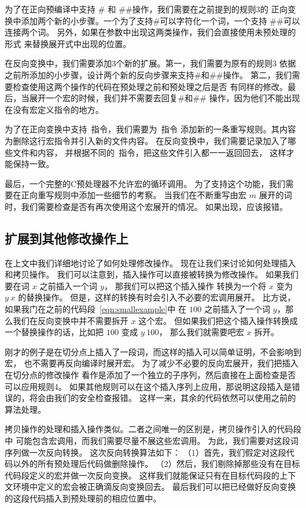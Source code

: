 为了在正向预编译中支持 \# 和 \#\#操作，我们需要在之前提到的规则3的
正向变换中添加两个新的小步骤。一个为了支持\#可以字符化一个词，一个支持
\#\#可以连接两个词。
另外，如果在参数中出现这两类操作，我们会直接使用未预处理的形式
来替换展开式中出现的位置。

在反向变换中，我们需要添加3个新的扩展。第一，我们需要为原有的规则3
依据之前所添加的小步骤，设计两个新的反向步骤来支持\#和\#\#操作。
第二，我们需要检查使用这两个操作的代码在预处理之前和预处理之后是否
有同样的修改。最后，当展开一个宏的时候，我们并不需要去回复\#和\#\#
操作，因为他们不能出现在没有宏定义指令的地方。

为了在正向变换中支持~指令，我们需要为~指令
添加新的一条重写规则。其内容为删除这行宏指令并引入新的文件内容。
在反向变换中，我们需要记录加入了哪些文件和内容，
并根据不同的~指令，把这些文件引入都一一返回回去，
这样才能保持一致。

最后，一个完整的C预处理器不允许宏的循环调用。
为了支持这个功能，我们需要在正向重写规则中添加一些细节的考察。
当我们在不断重写由宏 $m$ 展开的词时，我们需要检查是否有再次使用这个宏展开的情况。
如果出现，应该报错。

\subsection{扩展到其他修改操作上}\label{sec:extend-other-changes}
在上文中我们详细地讨论了如何处理修改操作。
现在让我们来讨论如何处理插入和拷贝操作。
我们可以注意到，插入操作可以直接被转换为修改操作。
如果我们要在词 $x$ 之前插入一个词 $y$， 那我们可以把这个插入操作
转换为一个将 $x$ 变为  $y\ x$ 的替换操作。
但是，这样的转换有时会引入不必要的宏调用展开。
比方说，如果我门在之前的代码段~\ref{eqn:smallexample}中
在 $100$ 之前插入了一个词 $y$，那么我们在反向变换中并不需要拆开 $x$ 这个宏。
但如果我们把这个插入操作转换成一个替换操作的话，比如把 $100$ 变成 $y\ 100$，
那么我们就需要吧宏 $x$ 拆开。

刚才的例子是在切分点上插入了一段词，而这样的插入可以简单证明，不会影响到宏，
也不需要再反向编译时展开宏。
为了减少不必要的反向宏展开，我们把插入在切分点的修改操作
看作是添加了一个独立的子序列，然后直接在上面检查是否可以应用规则4。
如果其他规则可以在这个插入序列上应用，那说明这段插入是错误的，将会由我们的安全检查报错。
这样一来，其余的代码依然可以使用之前的算法处理。

拷贝操作的处理和插入操作类似。二者之间唯一的区别是，拷贝操作引入的代码段中
可能包含宏调用，而我们需要尽量不展这些宏调用。
为此，我们需要对这段词序列做一次反向转换。
这次反向转换算法如下：
（1）首先，我们假定对这段代码以外的所有预处理后代码做删除操作。
（2）然后，我们剔除掉那些没有在目标代码段定义的宏并做一次反向变换。
这样我们就能保证只有在目标代码段的上下文环境中定义的宏会被正确滴反向变换回去。
最后我们可以把已经做好反向变换的这段代码插入到预处理前的相应位置中。

